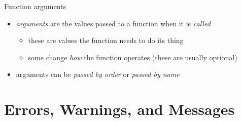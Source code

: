 \documentclass[
  11pt,
  ignorenonframetext,
]{beamer}
\newcommand{\VERB}{\Verb[commandchars=\\\{\}]}
\newcommand{\NormalTok}[1]{#1}
\newcommand{\OtherTok}[1]{\textcolor[rgb]{0.56,0.35,0.01}{#1}}
\providecommand{\tightlist}{%
  \setlength{\itemsep}{0pt}\setlength{\parskip}{0pt}}
\begin{document}
\begin{frame}[fragile]{Function arguments}
\protect\hypertarget{function-arguments}{}
\begin{itemize}
\item
  \emph{arguments} are the values passed to a function when it is
  \emph{called}

  \begin{itemize}
  \tightlist
  \item
    these are values the function needs to do its thing
  \item
    some change \emph{how} the function operates (these are usually
    optional)
  \end{itemize}
\item
  arguments can be \emph{passed by order} or \emph{passed by name}

\end{itemize}
\end{frame}

\hypertarget{errors-warnings-and-messages}{%
\section{Errors, Warnings, and
Messages}\label{errors-warnings-and-messages}}
\end{document}
